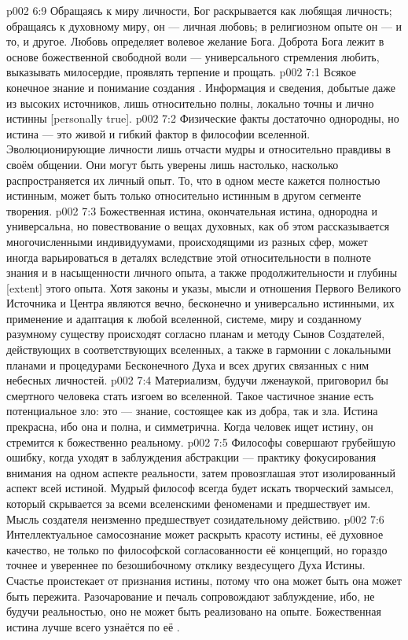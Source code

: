 \vs p002 6:9 \pc Обращаясь к миру личности, Бог раскрывается как любящая личность; обращаясь к духовному миру, он --- личная любовь; в религиозном опыте он --- и то, и другое. Любовь определяет волевое желание Бога. Доброта Бога лежит в основе божественной свободной воли --- универсального стремления любить, выказывать милосердие, проявлять терпение и прощать.
\vs p002 7:1 Всякое конечное знание и понимание создания . Информация и сведения, добытые даже из высоких источников, лишь относительно полны, локально точны и лично истинны [personally true].
\vs p002 7:2 Физические факты достаточно однородны, но истина --- это живой и гибкий фактор в философии вселенной. Эволюционирующие личности лишь отчасти мудры и относительно правдивы в своём общении. Они могут быть уверены лишь настолько, насколько распространяется их личный опыт. То, что в одном месте кажется полностью истинным, может быть только относительно истинным в другом сегменте творения.
\vs p002 7:3 Божественная истина, окончательная истина, однородна и универсальна, но повествование о вещах духовных, как об этом рассказывается многочисленными индивидуумами, происходящими из разных сфер, может иногда варьироваться в деталях вследствие этой относительности в полноте знания и в насыщенности личного опыта, а также продолжительности и глубины [extent] этого опыта. Хотя законы и указы, мысли и отношения Первого Великого Источника и Центра являются вечно, бесконечно и универсально истинными, их применение и адаптация к любой вселенной, системе, миру и созданному разумному существу происходят согласно планам и методу Сынов Создателей, действующих в соответствующих вселенных, а также в гармонии с локальными планами и процедурами Бесконечного Духа и всех других связанных с ним небесных личностей.
\vs p002 7:4 \pc Материализм, будучи лженаукой, приговорил бы смертного человека стать изгоем во вселенной. Такое частичное знание есть потенциальное зло: это --- знание, состоящее как из добра, так и зла. Истина прекрасна, ибо она и полна, и симметрична. Когда человек ищет истину, он стремится к божественно реальному.
\vs p002 7:5 Философы совершают грубейшую ошибку, когда уходят в заблуждения абстракции --- практику фокусирования внимания на одном аспекте реальности, затем провозглашая этот изолированный аспект всей истиной. Мудрый философ всегда будет искать творческий замысел, который скрывается за всеми вселенскими феноменами и предшествует им. Мысль создателя неизменно предшествует созидательному действию.
\vs p002 7:6 Интеллектуальное самосознание может раскрыть красоту истины, её духовное качество, не только по философской согласованности её концепций, но гораздо точнее и увереннее по безошибочному отклику вездесущего Духа Истины. Счастье проистекает от признания истины, потому что она может быть  она может быть пережита. Разочарование и печаль сопровождают заблуждение, ибо, не будучи реальностью, оно не может быть реализовано на опыте. Божественная истина лучше всего узнаётся по её .
